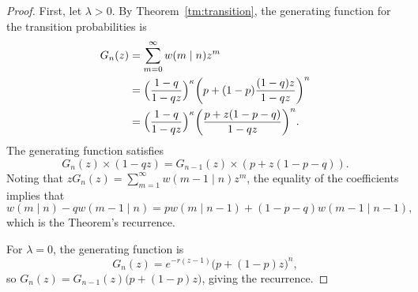 \documentclass{elsarticle}
\begin{document}
\begin{proof}\small
First, let $\lambda>0$. 
By Theorem~\ref{tm:transition}, the generating function for 
the transition probabilities is
\begin{align*}
G_n(z) & = \sum_{m=0}^\infty  w(m\mid n)  z^m \\
& = \Bigl(\frac{1-q}{1-q z}\Bigr)^{\kappa}\biggl(p +(1-p) \frac{(1-q)z}{1-q z}\biggr)^n
\\
& = \Bigl(\frac{1-q}{1-q z}\Bigr)^{\kappa}\biggl(\frac{p+z(1-p-q)}{1-q z}\biggr)^n.
%
\end{align*}
The generating function satisfies 
\[
G_n(z)\times (1-qz) = G_{n-1}(z) \times (p+z(1-p-q)).
\]
Noting that $z G_n(z) = \sum_{m=1}^\infty  w(m-1\mid n)  z^{m}$,
the equality of the coefficients implies 
that
\[
w(m\mid n)-q w(m-1\mid n) = p w(m\mid n-1) +(1-p-q) w(m-1\mid n-1),
\]
which is the Theorem's recurrence.  

For $\lambda=0$, the generating function is 
\[
G_n(z)=e^{-r(z-1)}\bigl(p+(1-p)z)^n,
\]
so $G_n(z)=G_{n-1}(z)\bigl(p+(1-p)z\bigr)$, giving the recurrence.  
\end{proof}
\end{document}
